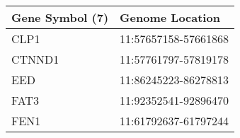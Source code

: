 \begin{tabular}{ll}
\toprule
Gene Symbol (7) &      Genome Location \\
\midrule
           CLP1 & 11:57657158-57661868 \\
         CTNND1 & 11:57761797-57819178 \\
            EED & 11:86245223-86278813 \\
           FAT3 & 11:92352541-92896470 \\
           FEN1 & 11:61792637-61797244 \\
\bottomrule
\end{tabular}
